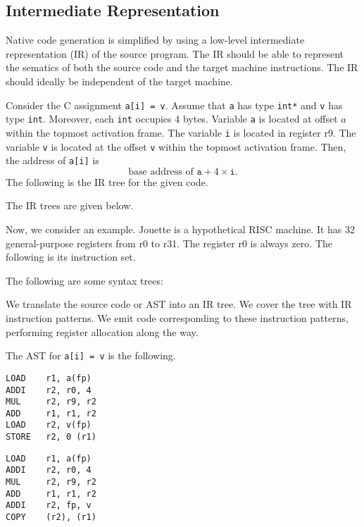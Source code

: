 \documentclass[a4paper, openany]{memoir}
\begin{document}
\subsection{Intermediate Representation}
Native code generation is simplified by using a low-level intermediate representation (IR) of the source program. The IR should be able to represent the sematics of both the source code and the target machine instructions. The IR should ideally be independent of the target machine.

Consider the C assignment \texttt{a[i] = v}. Assume that \texttt{a} has type \texttt{int*} and \texttt{v} has type \texttt{int}. Moreover, each \texttt{int} occupies 4 bytes. Variable \texttt{a} is located at offset $a$ within the topmost activation frame. The variable \texttt{i} is located in register r9. The variable \texttt{v} is located at the offset \texttt{v} within the topmost activation frame. Then, the address of \texttt{a[i]} is
\[\text{base address of } \texttt{a} + 4 \times \texttt{i}.\]
The following is the IR tree for the given code.

The IR trees are given below.

Now, we consider an example. Jouette is a hypothetical RISC machine. It has 32 general-purpose registers from r0 to r31. The register r0 is always zero. The following is its instruction set.

The following are some syntax trees:

We translate the source code or AST into an IR tree. We cover the tree with IR instruction patterns. We emit code corresponding to these instruction patterns, performing register allocation along the way.

The AST for \texttt{a[i] = v} is the following.
\begin{lstlisting}
LOAD    r1, a(fp)
ADDI    r2, r0, 4
MUL     r2, r9, r2
ADD     r1, r1, r2
LOAD    r2, v(fp)
STORE   r2, 0 (r1)
\end{lstlisting}

\begin{lstlisting}
LOAD    r1, a(fp)
ADDI    r2, r0, 4
MUL     r2, r9, r2
ADD     r1, r1, r2
ADDI    r2, fp, v
COPY    (r2), (r1)
\end{lstlisting}
\end{document}
